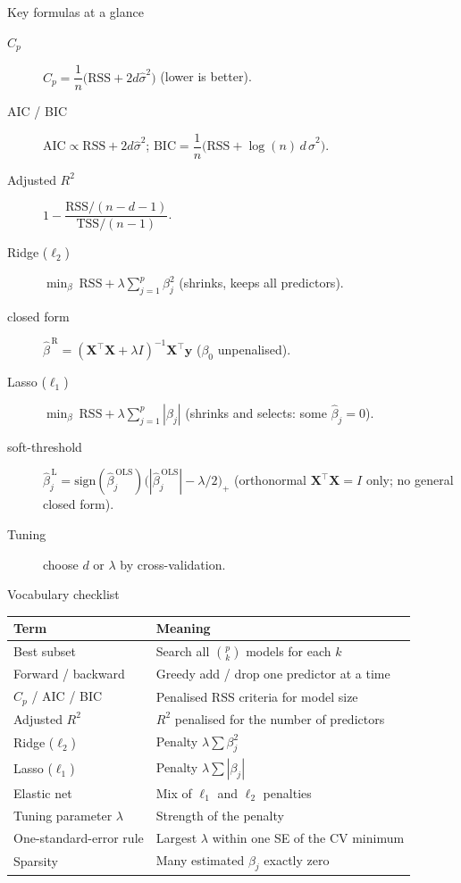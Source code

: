 \documentclass[aspectratio=169,11pt]{beamer}
\begin{document}
\begin{frame}{Key formulas at a glance}
  \footnotesize
  \begin{description}
    \item[$C_p$] $C_p=\dfrac1n\big(\mathrm{RSS}+2d\hat\sigma^2\big)$ \quad (lower is better).
    \item[AIC / BIC] $\mathrm{AIC}\propto \mathrm{RSS}+2d\hat\sigma^2$; \quad $\mathrm{BIC}=\dfrac1n\big(\mathrm{RSS}+\log(n)\,d\,\hat\sigma^2\big)$.
    \item[Adjusted $R^2$] $1-\dfrac{\mathrm{RSS}/(n-d-1)}{\mathrm{TSS}/(n-1)}$.
    \item[Ridge ($\ell_2$)] $\min_\beta\ \mathrm{RSS}+\lambda\sum_{j=1}^p\beta_j^2$ \quad (shrinks, keeps all predictors).
    \item[\quad closed form] $\hat\beta^{\,\mathrm R} = (\mathbf{X}^\top \mathbf{X} + \lambda I)^{-1}\mathbf{X}^\top \mathbf{y}$ \quad ($\beta_0$ unpenalised).
    \item[Lasso ($\ell_1$)] $\min_\beta\ \mathrm{RSS}+\lambda\sum_{j=1}^p|\beta_j|$ \quad (shrinks and selects: some $\hat\beta_j=0$).
    \item[\quad soft-threshold] $\hat\beta_j^{\,\mathrm L} = \mathrm{sign}(\hat\beta_j^{\,\mathrm{OLS}})\bigl(|\hat\beta_j^{\,\mathrm{OLS}}| - \lambda/2\bigr)_{+}$ \quad (orthonormal $\mathbf{X}^\top\mathbf{X}=I$ only; no general closed form).
    \item[Tuning] choose $d$ or $\lambda$ by cross-validation.
  \end{description}
\end{frame}

\begin{frame}{Vocabulary checklist}
  \footnotesize
  \begin{tabular}{ll}
    \toprule
    \textbf{Term} & \textbf{Meaning} \\
    \midrule
    Best subset & Search all $\binom{p}{k}$ models for each $k$ \\
    Forward / backward & Greedy add / drop one predictor at a time \\
    $C_p$ / AIC / BIC & Penalised RSS criteria for model size \\
    Adjusted $R^2$ & $R^2$ penalised for the number of predictors \\
    Ridge ($\ell_2$) & Penalty $\lambda \sum \beta_j^2$ \\
    Lasso ($\ell_1$) & Penalty $\lambda \sum |\beta_j|$ \\
    Elastic net & Mix of $\ell_1$ and $\ell_2$ penalties \\
    Tuning parameter $\lambda$ & Strength of the penalty \\
    One-standard-error rule & Largest $\lambda$ within one SE of the CV minimum \\
    Sparsity & Many estimated $\beta_j$ exactly zero \\
    \bottomrule
  \end{tabular}
\end{frame}
\end{document}
